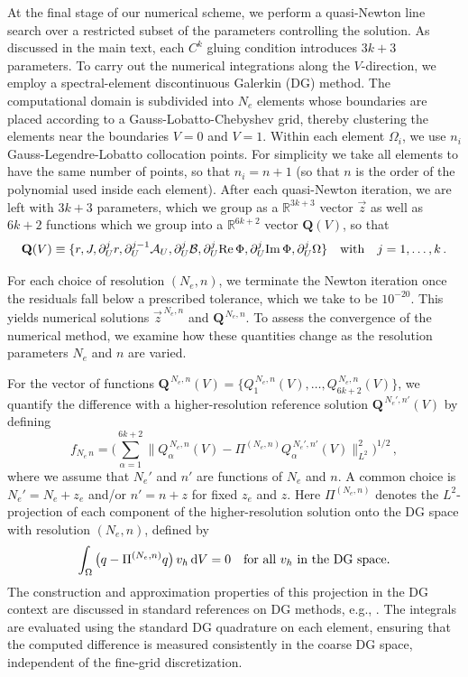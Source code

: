 \documentclass[prl,twocolumn,superscriptaddress,nofootinbib]{revtex4-2}
\begin{document}
At the final stage of our numerical scheme, we perform a quasi-Newton line search over a restricted subset of the parameters controlling the solution. As discussed in the main text, each $C^k$ gluing condition introduces $3k+3$ parameters. To carry out the numerical integrations along the $V$-direction, we employ a spectral-element discontinuous Galerkin (DG) method. The computational domain is subdivided into $N_e$ elements whose boundaries are placed according to a Gauss-Lobatto-Chebyshev grid, thereby clustering the elements near the boundaries $V=0$ and $V=1$. Within each element $\Omega_i$, we use $n_i$ Gauss-Legendre-Lobatto collocation points. For simplicity we take all elements to have the same number of points, so that $n_i=n+1$ (so that $n$ is the order of the polynomial used inside each element). After each quasi-Newton iteration, we are left with $3k+3$ parameters, which we group as a $\mathbb{R}^{3k+3}$ vector $\vec{z}$ as well as $6k+2$ functions which we group into a $\mathbb{R}^{6k+2}$ vector $\mathbf{Q}(V)$, so that
\begin{equation}
\mathbf{Q}(V)\equiv\{r,J,\partial_U^j r,\partial_U^{j-1}\mathcal{A}_U,\partial^j_U \mathcal{B},\partial^j_U {\rm Re}\,\Phi,\partial^j_U {\rm Im}\,\Phi,\partial_U^j \Omega\}\quad\text{with}\quad j=1,\dots,k\,.
\end{equation}

For each choice of resolution $(N_e,n)$, we terminate the Newton iteration once the residuals fall below a prescribed tolerance, which we take to be $10^{-20}$. This yields numerical solutions $\vec{z}^{\,N_e,n}$ and $\mathbf{Q}^{\,N_e,n}$. To assess the convergence of the numerical method, we examine how these quantities change as the resolution parameters $N_e$ and $n$ are varied.

For the vector of functions $\mathbf{Q}^{\,N_e,n}(V) = \big\{Q^{\,N_e,n}_1(V), \dots, Q^{\,N_e,n}_{6k+2}(V)\big\}$, we quantify the difference with a higher-resolution reference solution $\mathbf{Q}^{\,N_e',n'}(V)$ by defining
\begin{equation}
f_{N_e\,n} = \Bigg( \sum_{\alpha=1}^{6k+2} \Big\| Q_\alpha^{\,N_e,n}(V) - \Pi^{(N_e,n)} Q_\alpha^{\,N_e',n'}(V) \Big\|_{L^2}^2 \Bigg)^{1/2}\,,
\end{equation}
where we assume that $N_e'$ and $n'$ are functions of $N_e$ and $n$. A common choice is $N_e'=N_e+z_e$ and/or $n'=n+z$ for fixed $z_e$ and $z$. Here $\Pi^{(N_e,n)}$ denotes the $L^2$-projection of each component of the higher-resolution solution onto the DG space with resolution $(N_e,n)$, defined by
\begin{equation}
\int_\Omega \big(q - \Pi^{(N_e,n)}q\big)\,v_h\,{\rm d}V = 0
\quad\text{for all } v_h \text{ in the DG space}.
\end{equation}
The construction and approximation properties of this projection in the DG context are discussed in standard references on DG methods, e.g., \cite{Riviere:2008}. The integrals are evaluated using the standard DG quadrature on each element, ensuring that the computed difference is measured consistently in the coarse DG space, independent of the fine-grid discretization.
\end{document}
